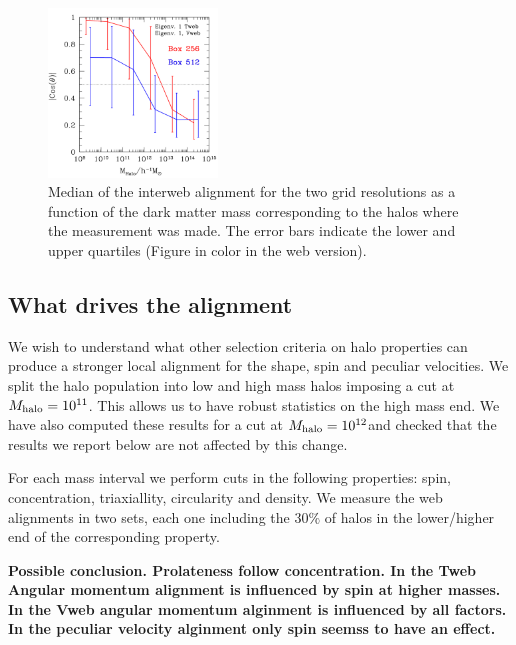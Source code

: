 \documentclass[useAMS,usenatbib]{mn2e}
\newcommand{\hMsun}{{\ifmmode{h^{-1}{\rm
        {M_{\odot}}}}\else{$h^{-1}{\rm{M_{\odot}}}$~}\fi}}
\begin{document}
\begin{figure}
\includegraphics[width=0.40\textwidth]{Fig5.pdf}
\caption{Median of the interweb alignment for the two grid
  resolutions as a function of the dark matter mass corresponding to
  the halos where the measurement was made. The error bars indicate
  the lower and upper quartiles (Figure in color in the web version).
\label{fig:interweb}} 
\end{figure}


\subsection{What drives the alignment}

We wish to understand what other selection criteria on halo
properties can produce a stronger local alignment for the shape, spin
and peculiar velocities. We split the halo population into low and
high mass halos imposing a cut at $M_{\rm halo}=10^{11}$\hMsun. This
allows us to have robust statistics on the high mass end. We have also
computed these results for a cut at $M_{\rm halo}=10^{12}$\hMsun and
checked that the results we report below are not affected by this
change.

For each mass interval we perform cuts in the following properties:
spin, concentration, triaxiallity, circularity  and density. We
measure the web alignments in two sets, each one including the $30\%$
of halos in the lower/higher end of the corresponding property.

{\bf Possible conclusion. Prolateness follow concentration. In the Tweb
Angular momentum alignment is influenced by spin at higher masses. In
the Vweb angular momentum alginment is influenced by all factors. In
the peculiar velocity alginment only spin seemss to have an effect. }
\end{document}
